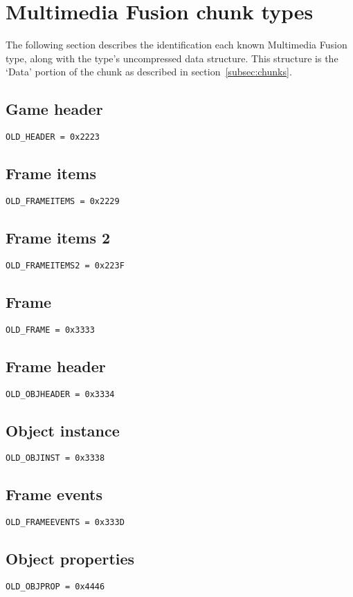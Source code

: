 \documentclass{article}
\begin{document}

\section[MMF chunks]{Multimedia Fusion chunk types}
\label{sec:mmf-chunks}

The following section describes the identification each known Multimedia
Fusion type, along with the type's uncompressed data structure.
This structure is the `Data' portion of the chunk as described in
section~\ref{subsec:chunks}.

\subsection{Game header}
\verb|OLD_HEADER = 0x2223|

\subsection{Frame items}
\verb|OLD_FRAMEITEMS = 0x2229|

\subsection{Frame items 2}
\verb|OLD_FRAMEITEMS2 = 0x223F|

\subsection{Frame}
\verb|OLD_FRAME = 0x3333|

\subsection{Frame header}
\verb|OLD_OBJHEADER = 0x3334|

\subsection{Object instance}
\verb|OLD_OBJINST = 0x3338|

\subsection{Frame events}
\verb|OLD_FRAMEEVENTS = 0x333D|

\subsection{Object properties}
\verb|OLD_OBJPROP = 0x4446|
\end{document}
